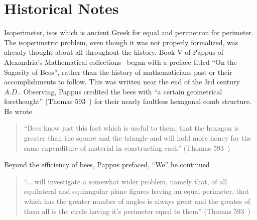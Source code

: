 \documentclass[a4paper]{book}
\numberwithin{theorem}{section}%
\begin{document}
\chapter{Historical Notes}
Isoperimeter, isos which is ancient Greek for equal and perimetron for perimeter. The isoperimetric problem, even though it was not properly formalized, was already thought about all throughout the history. 
\newline
\newline
Book V of Pappus of Alexandria's Mathematical collections~\citep{wiegert2010sagacity} began with a preface titled ``On the Sagacity of Bees'', rather than the history of mathematicians past or their accomplishments to follow. This was written near the end of the 3rd century $A.D.$. Observing, Pappus credited the bees with ``a certain geometrical forethought'' (Thomas 593~\citep{ivor1941selections}) for their nearly faultless hexagonal comb structure. He wrote
\begin{center}
    \begin{quote}
        ``Bees know just this fact which is useful to them, that 
        the hexagon is greater than the square and the triangle 
        and will hold more honey for the same expenditure of 
        material in constructing each'' (Thomas 593~\citep{ivor1941selections})
    \end{quote}
\end{center}
Beyond the efficiency of bees, Pappus prefaced, ``We'' he continued
\begin{center}
    \begin{quote}
        ``... will {}investigate a somewhat wider problem, namely that, 
        of all equilateral and equiangular plane figures having an equal 
        perimeter, that which has the greater number of angles is always great 
        and the greates of them all is the circle having it's perimeter equal to them'' (Thomas 593~\citep{ivor1941selections})
    \end{quote}
\end{center}
\end{document}
